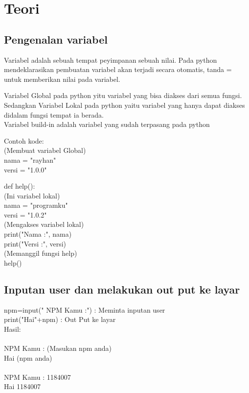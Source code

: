 \chapter*{Teori}

\section*{Pengenalan variabel}
\par
Variabel adalah sebuah tempat peyimpanan sebuah nilai. Pada python mendeklarasikan pembuatan variabel akan terjadi secara otomatis, tanda = untuk memberikan nilai pada variabel.

Variabel Global pada python yitu variabel yang bisa diakses dari semua fungsi.\\
Sedangkan Variabel Lokal pada python yaitu variabel yang hanya dapat diakses didalam fungsi tempat ia berada.\\
Variabel build-in adalah variabel yang sudah terpasang pada python

Contoh kode:\\
(Membuat variabel Global)\\
nama = "rayhan"\\
versi = "1.0.0"

def help():\\
	(Ini variabel lokal)\\
	nama = "programku"\\
	versi = "1.0.2"\\
	(Mengakses variabel lokal)\\
	print("Nama :", nama)\\
	print("Versi :", versi)\\
(Memanggil fungsi help)\\
help()	\\
\section*{Inputan user dan melakukan out put ke layar}
npm=input(" NPM Kamu :") : Meminta inputan user\\
print("Hai"+npm)        : Out Put ke layar\\
Hasil:\\
\\
NPM Kamu : (Masukan npm anda)\\
Hai (npm anda)\\
\\
NPM Kamu : 1184007\\
Hai 1184007\\

